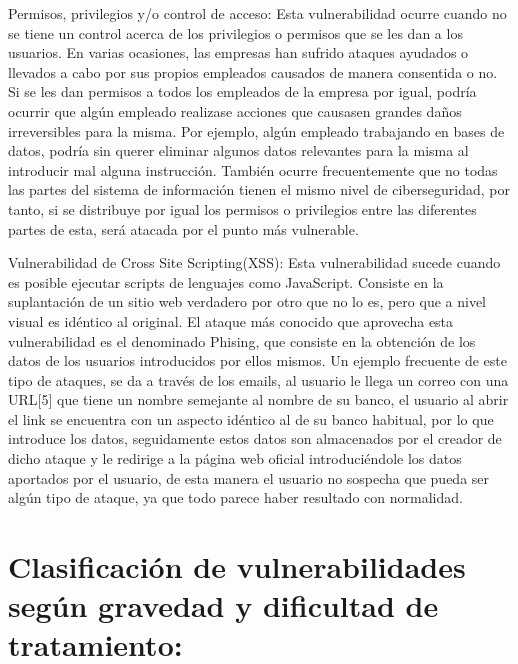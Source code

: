 Permisos, privilegios y/o control de acceso:
Esta vulnerabilidad ocurre cuando no se tiene un control acerca de los privilegios o permisos que se les dan a los usuarios.
En varias ocasiones, las empresas han sufrido ataques ayudados o llevados a cabo por sus propios empleados causados de manera consentida o no.
Si se les dan permisos a todos los empleados de la empresa por igual, podría ocurrir que algún empleado realizase acciones que causasen grandes daños irreversibles para la misma.
Por ejemplo, algún empleado trabajando en bases de datos, podría sin querer eliminar algunos datos relevantes para la misma al introducir mal alguna instrucción.
También ocurre frecuentemente que no todas las partes del sistema de información tienen el mismo nivel de ciberseguridad, por tanto, si se distribuye por igual los permisos o privilegios entre las diferentes partes de esta, será atacada por el punto más vulnerable.

Vulnerabilidad de Cross Site Scripting(XSS): 
Esta vulnerabilidad sucede cuando es posible ejecutar scripts de lenguajes como JavaScript.
Consiste en la suplantación de un sitio web verdadero por otro que no lo es, pero que a nivel visual es idéntico al original.
El ataque más conocido que aprovecha esta vulnerabilidad es el denominado Phising, que consiste en la obtención de los datos de los usuarios introducidos por ellos mismos.
Un ejemplo frecuente de este tipo de ataques, se da a través de los emails, al usuario le llega un correo con una URL[5] que tiene un nombre semejante al nombre de su banco, el usuario al abrir el link se encuentra con un aspecto idéntico al de su banco habitual, por lo que introduce los datos, seguidamente estos datos son almacenados por el creador de dicho ataque y le redirige a la página web oficial introduciéndole los datos aportados por el usuario, de esta manera el usuario no sospecha que pueda ser algún tipo de ataque, ya que todo parece haber resultado con normalidad.

\section{Clasificación de vulnerabilidades según gravedad y dificultad de tratamiento:}

